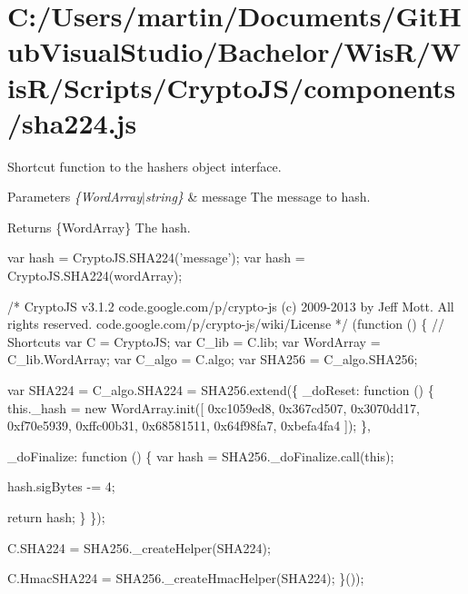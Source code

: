 \hypertarget{_c_1_2_users_2martin_2_documents_2_git_hub_visual_studio_2_bachelor_2_wis_r_2_wis_r_2_scripts_2_360301f8b63800a46bf88ed98ad6f540}{}\section{C\+:/\+Users/martin/\+Documents/\+Git\+Hub\+Visual\+Studio/\+Bachelor/\+Wis\+R/\+Wis\+R/\+Scripts/\+Crypto\+J\+S/components/sha224.\+js}
Shortcut function to the hasher\textquotesingle{}s object interface.


\begin{DoxyParams}{Parameters}
{\em \{\+Word\+Array$\vert$string\}} & message The message to hash.\\
\hline
\end{DoxyParams}
\begin{DoxyReturn}{Returns}
\{Word\+Array\} The hash.
\end{DoxyReturn}
\begin{DoxyVerb}var hash = CryptoJS.SHA224('message');
var hash = CryptoJS.SHA224(wordArray);\end{DoxyVerb}



\begin{DoxyCodeInclude}
\textcolor{comment}{/*}
\textcolor{comment}{CryptoJS v3.1.2}
\textcolor{comment}{code.google.com/p/crypto-js}
\textcolor{comment}{(c) 2009-2013 by Jeff Mott. All rights reserved.}
\textcolor{comment}{code.google.com/p/crypto-js/wiki/License}
\textcolor{comment}{*/}
(\textcolor{keyword}{function} () \{
    \textcolor{comment}{// Shortcuts}
    var C = CryptoJS;
    var C\_lib = C.lib;
    var WordArray = C\_lib.WordArray;
    var C\_algo = C.algo;
    var SHA256 = C\_algo.SHA256;

    var SHA224 = C\_algo.SHA224 = SHA256.extend(\{
        \_doReset: \textcolor{keyword}{function} () \{
            this.\_hash = \textcolor{keyword}{new} WordArray.init([
                0xc1059ed8, 0x367cd507, 0x3070dd17, 0xf70e5939,
                0xffc00b31, 0x68581511, 0x64f98fa7, 0xbefa4fa4
            ]);
        \},

        \_doFinalize: \textcolor{keyword}{function} () \{
            var hash = SHA256.\_doFinalize.call(\textcolor{keyword}{this});

            hash.sigBytes -= 4;

            \textcolor{keywordflow}{return} hash;
        \}
    \});

    C.SHA224 = SHA256.\_createHelper(SHA224);

    C.HmacSHA224 = SHA256.\_createHmacHelper(SHA224);
\}());
\end{DoxyCodeInclude}
 